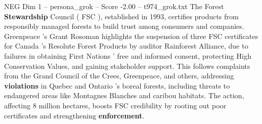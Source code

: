 \begin{textsample}{NEG Dim 1 – persona\_grok – Score -2.00 – t974\_grok.txt}  \label{ex:f1_neg_024}
The Forest \textbf{Stewardship} Council ( FSC ), established in 1993, certifies products from responsibly managed forests to build trust among consumers and companies.
Greenpeace 's Grant Rosoman highlights the suspension of three FSC certificates for Canada 's Resolute Forest Products by auditor Rainforest Alliance, due to failures in obtaining First Nations ' free and informed consent, protecting High Conservation Values, and gaining stakeholder support.
This follows complaints from the Grand Council of the Crees, Greenpeace, and others, addressing \textbf{violations} in Quebec and Ontario 's boreal forests, including threats to endangered areas like Montagnes Blanches and caribou habitats.
The action, affecting 8 million hectares, boosts FSC credibility by rooting out poor certificates and strengthening \textbf{enforcement}.

\end{textsample}

